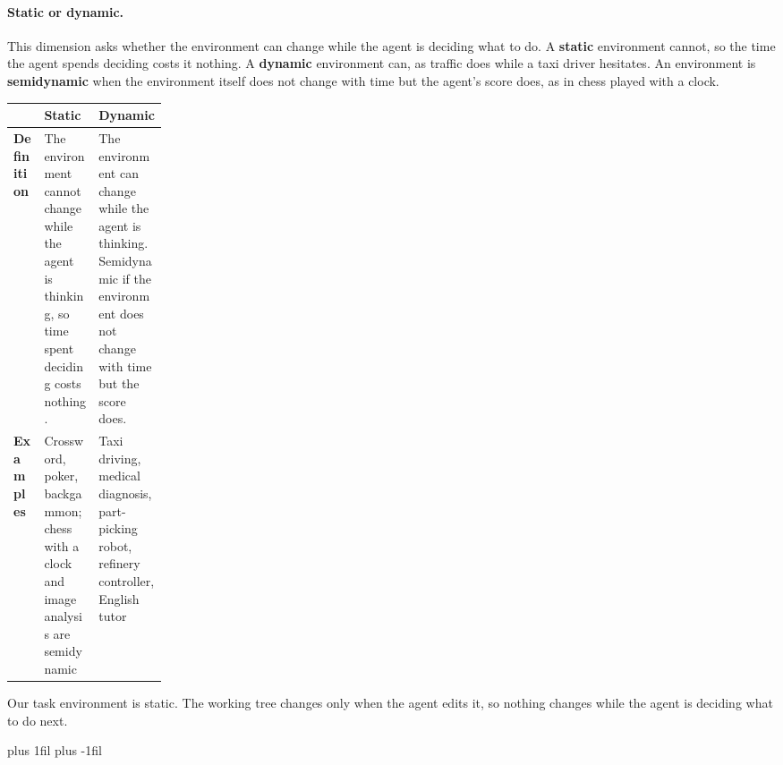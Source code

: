 \paragraph{Static or dynamic.}\leavevmode\par\nopagebreak
This dimension asks whether the environment can change while the agent is deciding what to do. A
\textbf{static} environment cannot, so the time the agent spends deciding costs it nothing. A
\textbf{dynamic} environment can, as traffic does while a taxi driver hesitates. An environment is
\textbf{semidynamic} when the environment itself does not change with time but the agent's score
does, as in chess played with a clock.
\par\nopagebreak\smallskip
\noindent\begin{adjustbox}{width=\linewidth}\begin{tabularx}{\linewidth}{L{0.2\linewidth}XX}
  \toprule
  & \textbf{Static} & \textbf{Dynamic} \\
  \midrule
  \textbf{Definition} & The environment cannot change while the agent is thinking, so time spent
  deciding costs nothing. & The environment can change while the agent is thinking. Semidynamic if
  the environment does not change with time but the score does. \\
  \textbf{Examples} & Crossword, poker, backgammon; chess with a clock and image analysis are
  semidynamic & Taxi driving, medical diagnosis, part-picking robot, refinery controller, English
  tutor \\
  \bottomrule
\end{tabularx}\end{adjustbox}\par
Our task environment is static. The working tree changes only when the agent edits it, so nothing
changes while the agent is deciding what to do next.

\par\vskip 0pt plus 1fil\vskip 0pt plus -1fil\relax
